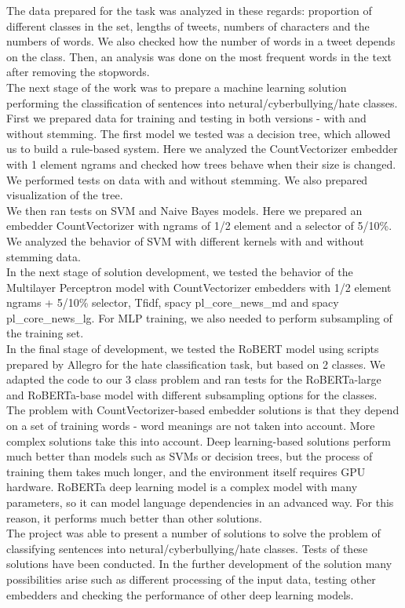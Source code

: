 \documentclass[a4paper]{article}
\begin{document}
The data prepared for the task was analyzed in these regards: proportion of different classes in the set, lengths of tweets, numbers of characters and the numbers of words. We also checked how the number of words in a tweet depends on the class. Then, an analysis was done on the most frequent words in the text after removing the stopwords. \\

The next stage of the work was to prepare a machine learning solution performing the classification of sentences into netural/cyberbullying/hate classes. First we prepared data for training and testing in both versions - with and without stemming. The first model we tested was a decision tree, which allowed us to build a rule-based system. Here we analyzed the CountVectorizer embedder with 1 element ngrams and checked how trees behave when their size is changed. We performed tests on data with and without stemming. We also prepared visualization of the tree. \\

We then ran tests on SVM and Naive Bayes models. Here we prepared an embedder CountVectorizer with ngrams of 1/2 element and a selector of 5/10\%. We analyzed the behavior of SVM with different kernels with and without stemming data. \\

In the next stage of solution development, we tested the behavior of the Multilayer Perceptron model with CountVectorizer embedders with 1/2 element ngrams + 5/10\% selector, Tfidf, spacy pl\_core\_news\_md and spacy pl\_core\_news\_lg. For MLP training, we also needed to perform subsampling of the training set. \\

In the final stage of development, we tested the RoBERT model using scripts prepared by Allegro for the hate classification task, but based on 2 classes. We adapted the code to our 3 class problem and ran tests for the RoBERTa-large and RoBERTa-base model with different subsampling options for the classes. \\

The problem with CountVectorizer-based embedder solutions is that they depend on a set of training words - word meanings are not taken into account. More complex solutions take this into account. 
Deep learning-based solutions perform much better than models such as SVMs or decision trees, but the process of training them takes much longer, and the environment itself requires GPU hardware. RoBERTa deep learning model is a complex model with many parameters, so it can model language dependencies in an advanced way. For this reason, it performs much better than other solutions. \\

The project was able to present a number of solutions to solve the problem of classifying sentences into netural/cyberbullying/hate classes. Tests of these solutions have been conducted. In the further development of the solution many possibilities arise such as different processing of the input data, testing other embedders and checking the performance of other deep learning models.

\newpage
\printbibliography
\end{document}

